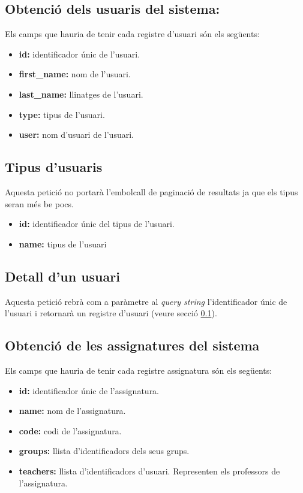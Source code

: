 \subsection{Obtenció dels usuaris del sistema:} \label{retrieve_users}

	Els camps que hauria de tenir cada registre d'usuari són els següents:
	
	\begin{itemize}
		
		\item \textbf{id:} identificador únic de l'usuari.
		\item \textbf{first\_name:} nom de l'usuari.
		\item \textbf{last\_name:} llinatges de l'usuari.
		\item \textbf{type:} tipus de l'usuari.
		\item \textbf{user:} nom d'usuari de l'usuari.
	\end{itemize}

\subsection{Tipus d'usuaris}
	
	Aquesta petició no portarà l'embolcall de paginació de resultats ja que els tipus seran més be pocs.
	
	\begin{itemize}
		\item \textbf{id:} identificador únic del tipus de l'usuari.
		\item \textbf{name:} tipus de l'usuari
	\end{itemize}

\subsection{Detall d'un usuari}

	Aquesta petició rebrà com a paràmetre al \emph{query string} l'identificador únic de l'usuari i retornarà un registre d'usuari (veure secció \ref{retrieve_users}).
	
\subsection{Obtenció de les assignatures del sistema}

	Els camps que hauria de tenir cada registre assignatura són els següents:
	
	\begin{itemize}
		
		\item \textbf{id:} identificador únic de l'assignatura.
		\item \textbf{name:} nom de l'assignatura.
		\item \textbf{code:} codi de l'assignatura.
		\item \textbf{groups:} llista d'identificadors dels seus grups.
		\item \textbf{teachers:} llista d'identificadors d'usuari. Representen els professors de l'assignatura.
	\end{itemize}


